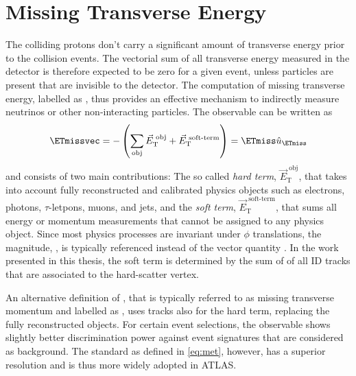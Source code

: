 \section{Missing Transverse Energy}
The colliding protons don't carry a significant amount of transverse energy prior to the collision events.
The vectorial sum of all transverse energy measured in the detector is therefore expected to be zero for a given event, unless particles are present that are invisible to the detector. The computation of missing transverse energy, labelled as \ETmissvec, thus provides an effective mechanism to indirectly measure neutrinos or other non-interacting particles.
The \ETmissvec observable can be written as
\begin{equation}
    \ETmissvec = - \left( \sum_{\text{obj}} \vec{E}_{\text{T}}^\text{ obj} + \vec{E}_{\text{T}}^\text{ soft-term} \right)
    = \ETmiss \hat{u}_{\ETmiss}
    \label{eq:met}
\end{equation}
and consists of two main contributions: The so called \emph{hard term}, $\vec{E}_{\text{T}}^\text{ obj}$, that takes into account fully reconstructed and calibrated physics objects such as electrons, photons, $\tau$-letpons, muons, and jets, and the \emph{soft term}, $\vec{E}_{\text{T}}^\text{ soft-term}$, that sums all energy or momentum measurements that cannot be assigned to any physics object.
Since most physics processes are invariant under $\phi$ translations, the magnitude, \ETmiss, is typically referenced instead of the vector quantity \ETmissvec.
In the work presented in this thesis, the soft term is determined by the sum of \pT of all ID tracks that are associated to the hard-scatter vertex.

An alternative definition of \ETmiss, that is typically referred to as missing transverse momentum and labelled as \pTmiss, uses tracks also for the hard term, replacing the fully reconstructed objects.
For certain event selections, the \pTmiss observable shows slightly better discrimination power against event signatures that are considered as background. The standard \ETmiss as defined in \cref{eq:met}, however, has a superior resolution and is thus more widely adopted in ATLAS.

